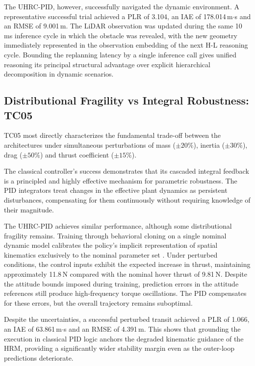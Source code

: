 \documentclass[12pt, a4paper]{article}
\begin{document}
The UHRC-PID, however, successfully navigated the dynamic environment.
A representative successful trial achieved a PLR of 3.104, an IAE of 178.014\,m$\cdot$s and an RMSE of 9.001\,m.
The LiDAR observation was updated during the same 10\,ms inference cycle in which the obstacle was revealed, with the new geometry immediately represented in the observation embedding of the next H-L reasoning cycle.
Bounding the replanning latency by a single inference call gives unified reasoning its principal structural advantage over explicit hierarchical decomposition in dynamic scenarios.

\subsection{Distributional Fragility vs Integral Robustness: TC05}
\label{sec:discuss_robustness}

TC05 most directly characterizes the fundamental trade-off between the architectures under simultaneous perturbations of mass ($\pm 20\%$), inertia ($\pm 30\%$), drag ($\pm 50\%$) and thrust coefficient ($\pm 15\%$).

The classical controller's success demonstrates that its cascaded integral feedback is a principled and highly effective mechanism for parametric robustness.
The PID integrators treat changes in the effective plant dynamics as persistent disturbances, compensating for them continuously without requiring knowledge of their magnitude.

The UHRC-PID achieves similar performance, although some distributional fragility remains.
Training through behavioral cloning on a single nominal dynamic model calibrates the policy's implicit representation of spatial kinematics exclusively to the nominal parameter set \parencite{le_mero_survey_2022}.
Under perturbed conditions, the control inputs exhibit the expected increase in thrust, maintaining approximately 11.8\,N compared with the nominal hover thrust of 9.81\,N.
Despite the attitude bounds imposed during training, prediction errors in the attitude references still produce high-frequency torque oscillations.
The PID compensates for these errors, but the overall trajectory remains suboptimal.

Despite the uncertainties, a successful perturbed transit achieved a PLR of 1.066, an IAE of 63.861\,m$\cdot$s and an RMSE of 4.391\,m.
This shows that grounding the execution in classical PID logic anchors the degraded kinematic guidance of the HRM, providing a significantly wider stability margin even as the outer-loop predictions deteriorate.
\end{document}
